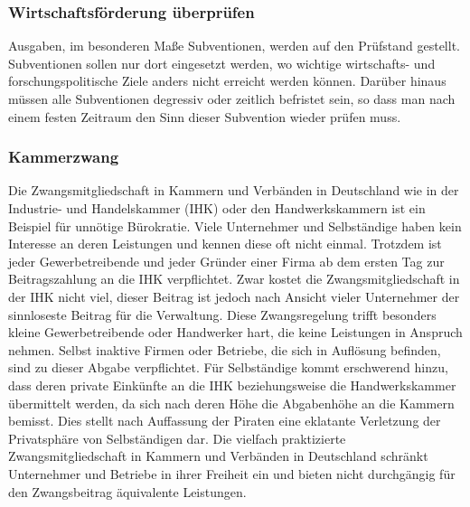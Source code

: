 \label{wp:wirt:wirt2}

\subsubsection{Wirtschaftsförderung überprüfen}
\abstimmung
Ausgaben, im besonderen Maße Subventionen, werden auf den Prüfstand gestellt. Subventionen sollen nur dort eingesetzt werden, wo wichtige wirtschafts- und forschungspolitische Ziele anders nicht erreicht werden können. Darüber hinaus müssen alle Subventionen degressiv oder zeitlich befristet sein, so dass man nach einem festen Zeitraum den Sinn dieser Subvention wieder prüfen muss.
 
\newpage
{}\label{wp:wirt:zwang1}

\subsubsection{Kammerzwang}
\abstimmung
Die Zwangsmitgliedschaft in Kammern und Verbänden in Deutschland wie in der Industrie- und Handelskammer (IHK) oder den Handwerkskammern ist ein Beispiel für unnötige Bürokratie. Viele Unternehmer und Selbständige haben kein Interesse an deren Leistungen und kennen diese oft nicht einmal. Trotzdem ist jeder Gewerbetreibende und jeder Gründer einer Firma ab dem ersten Tag zur Beitragszahlung an die IHK verpflichtet. Zwar kostet die Zwangsmitgliedschaft in der IHK nicht viel, dieser Beitrag ist jedoch nach Ansicht vieler Unternehmer der sinnloseste Beitrag für die Verwaltung. Diese Zwangsregelung trifft besonders kleine Gewerbetreibende oder Handwerker hart, die keine Leistungen in Anspruch nehmen. Selbst inaktive Firmen oder Betriebe, die sich in Auflösung befinden, sind zu dieser Abgabe verpflichtet. Für Selbständige kommt erschwerend hinzu, dass deren private Einkünfte an die IHK beziehungsweise die Handwerkskammer übermittelt werden, da sich nach deren Höhe die Abgabenhöhe an die Kammern bemisst. Dies stellt nach Auffassung der Piraten eine eklatante Verletzung der Privatsphäre von Selbständigen dar. Die vielfach praktizierte Zwangsmitgliedschaft in Kammern und Verbänden in Deutschland schränkt Unternehmer und Betriebe in ihrer Freiheit ein und bieten nicht durchgängig für den Zwangsbeitrag äquivalente Leistungen.

